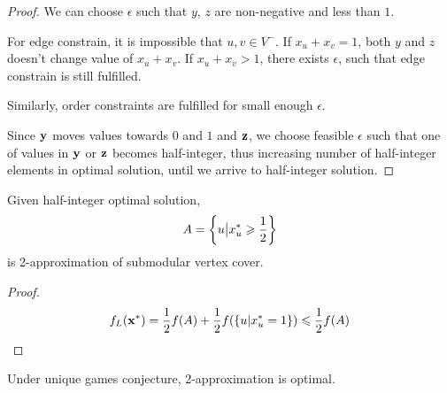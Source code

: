 \begin{prop}
\begin{proof}
		We can choose $\epsilon$ such that $y$, $z$ are non-negative and less than $1$.
		
		For edge constrain, it is impossible that $u,v \in V^-$. If $x_u+x_v=1$, both $y$ and $z$ doesn't change value of $x_u+x_v$. If $x_u+x_v>1$, there exists $\epsilon$, such that edge constrain is still fulfilled.
		
		Similarly, order constraints are fulfilled for small enough $\epsilon$.
		
		Since $\vb{y}$ moves values towards $0$ and $1$ and $\vb{z}$, we choose feasible $\epsilon$ such that one of values in $\vb{y}$ or $\vb{z}$ becomes half-integer, thus increasing number of half-integer elements in optimal solution, until we arrive to half-integer solution.
	\end{proof}
\end{prop}

\begin{prop}
	Given half-integer optimal solution, 
	\begin{align}
	A = \qty{ u \big\vert x^*_u \geqslant \frac{1}{2} }
	\end{align}
	is 2-approximation of submodular vertex cover.
	\begin{proof}
		\begin{align}
			f_L(\vb{x}^*) = \frac{1}{2} f(A) + \frac{1}{2} f\qty(\qty{u|x^*_u=1}) \leqslant  \frac{1}{2} f(A)
		\end{align}
	\end{proof}
\end{prop}

\begin{prop}
	Under unique games conjecture, 2-approximation is optimal.
\end{prop}